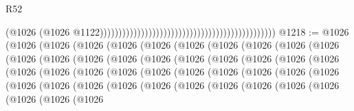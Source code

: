 \begin{lexlean}{R52}
\begin{coremodule}
                                                                                              (@1026
                                                                                                (@1026
                                                                                                  @1122)))))))))))))))))))))))))))))))))))))))))))))))
@1218 := @1026
    (@1026
      (@1026
        (@1026
          (@1026
            (@1026
              (@1026
                (@1026
                  (@1026
                    (@1026
                      (@1026
                        (@1026
                          (@1026
                            (@1026
                              (@1026
                                (@1026
                                  (@1026
                                    (@1026
                                      (@1026
                                        (@1026
                                          (@1026
                                            (@1026
                                              (@1026
                                                (@1026
                                                  (@1026
                                                    (@1026
                                                      (@1026
                                                        (@1026
                                                          (@1026
                                                            (@1026
                                                              (@1026
                                                                (@1026
                                                                  (@1026
                                                                    (@1026
                                                                      (@1026
                                                                        (@1026
                                                                          (@1026
                                                                            (@1026
                                                                              (@1026
                                                                                (@1026
                                                                                  (@1026
                                                                                    (@1026
                                                                                      (@1026
                                                                                        (@1026

\end{coremodule}
\end{lexlean}
